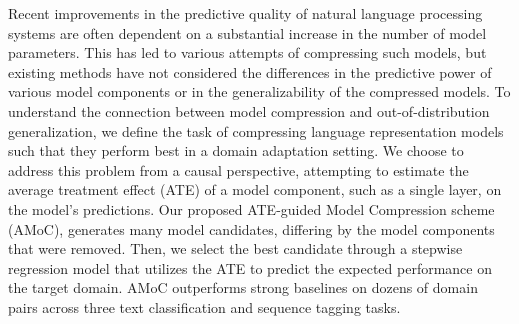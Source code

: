 Recent improvements in the predictive quality of natural language processing systems are often dependent on a substantial increase in the number of model parameters. This has led to various attempts of compressing such models, but existing methods have not considered the differences in the predictive power of various model components or in the generalizability of the compressed models. To understand the connection between model compression and out-of-distribution generalization, we define the task of compressing language representation models such that they perform best in a domain adaptation setting. We choose to address this problem from a causal perspective, attempting to estimate the average treatment effect (ATE) of a model component, such as a single layer, on the model's predictions. Our proposed ATE-guided Model Compression scheme (AMoC), generates many model candidates, differing by the model components that were removed. Then, we select the best candidate through a stepwise regression model that utilizes the ATE to predict the expected performance on the target domain. AMoC outperforms strong baselines on dozens of domain pairs across three text classification and sequence tagging tasks.